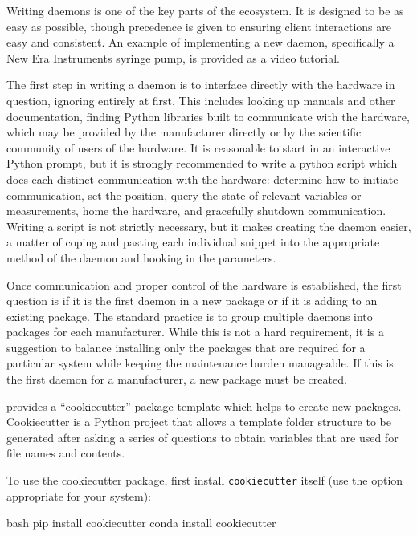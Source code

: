Writing daemons is one of the key parts of the \yaq{} ecosystem.
It is designed to be as easy as possible, though precedence is given to ensuring client interactions are easy and consistent.
An example of implementing a new daemon, specifically a New Era Instruments syringe pump, is provided as a video tutorial\cite{}.


The first step in writing a daemon is to interface directly with the hardware in question, ignoring \yaq{} entirely at first.
This includes looking up manuals and other documentation, finding Python libraries built to communicate with the hardware, which may be provided by the manufacturer directly or by the scientific community of users of the hardware.
It is reasonable to start in an interactive Python prompt, but it is strongly recommended to write a python script which does each distinct communication with the hardware: determine how to initiate communication, set the position, query the state of relevant variables or measurements, home the hardware, and gracefully shutdown communication.
Writing a script is not strictly necessary, but it makes creating the daemon easier, a matter of coping and pasting each individual snippet into the appropriate method of the daemon and hooking in the parameters.

Once communication and proper control of the hardware is established, the first question is if it is the first daemon in a new package or if it is adding to an existing package.
The standard practice is to group multiple daemons into packages for each manufacturer.
While this is not a hard requirement, it is a suggestion to balance installing only the packages that are required for a particular system while keeping the maintenance burden manageable.
If this is the first daemon for a manufacturer, a new package must be created.

\yaq{} provides a ``cookiecutter'' package template which helps to create new \yaq{} packages\cite{}.
Cookiecutter is a Python project that allows a template folder structure to be generated after asking a series of questions to obtain variables that are used for file names and contents\cite{}.

To use the \yaq{} cookiecutter package, first install \texttt{cookiecutter} itself (use the option appropriate for your system):

\begin{codefragment}{bash}
pip install cookiecutter
conda install cookiecutter
\end{codefragment}

